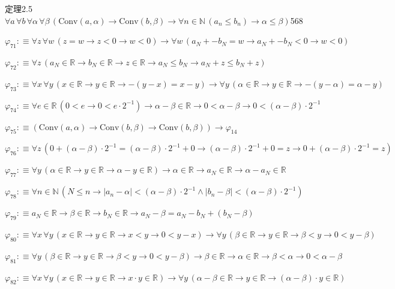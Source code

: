 \begin{fullproof}{定理2.5}{$\forall a\,\forall b\,\forall \alpha\,\forall \beta\,(\mathrm{Conv}(a,\alpha) \to \mathrm{Conv}(b,\beta) \to \forall n \in \mathbb{N}\,(a_{n} \leq b_{n}) \to \alpha \leq \beta)$}{568}
\begin{abbrevlist}
\item $\varphi_{71} :\equiv \forall z\,\forall w\,(z = w \to z < 0 \to w < 0) \to \forall w\,(a_{N} + -b_{N} = w \to a_{N} + -b_{N} < 0 \to w < 0)$
\item $\varphi_{72} :\equiv \forall z\,(a_{N} \in \mathbb{R} \to b_{N} \in \mathbb{R} \to z \in \mathbb{R} \to a_{N} \leq b_{N} \to a_{N} + z \leq b_{N} + z)$
\item $\varphi_{73} :\equiv \forall x\,\forall y\,(x \in \mathbb{R} \to y \in \mathbb{R} \to -(y - x) = x - y) \to \forall y\,(\alpha \in \mathbb{R} \to y \in \mathbb{R} \to -(y - \alpha) = \alpha - y)$
\item $\varphi_{74} :\equiv \forall e \in \mathbb{R}\,(0 < e \to 0 < e \cdot 2^{-1}) \to \alpha - \beta \in \mathbb{R} \to 0 < \alpha - \beta \to 0 < (\alpha - \beta) \cdot 2^{-1}$
\item $\varphi_{75} :\equiv (\mathrm{Conv}(a,\alpha) \to \mathrm{Conv}(b,\beta) \to \mathrm{Conv}(b,\beta)) \to \varphi_{14}$
\item $\varphi_{76} :\equiv \forall z\,(0 + (\alpha - \beta) \cdot 2^{-1} = (\alpha - \beta) \cdot 2^{-1} + 0 \to (\alpha - \beta) \cdot 2^{-1} + 0 = z \to 0 + (\alpha - \beta) \cdot 2^{-1} = z)$
\item $\varphi_{77} :\equiv \forall y\,(\alpha \in \mathbb{R} \to y \in \mathbb{R} \to \alpha - y \in \mathbb{R}) \to \alpha \in \mathbb{R} \to a_{N} \in \mathbb{R} \to \alpha - a_{N} \in \mathbb{R}$
\item $\varphi_{78} :\equiv \forall n \in \mathbb{N}\,(N \leq n \to \lvert a_{n} - \alpha \rvert < (\alpha - \beta) \cdot 2^{-1} \land \lvert b_{n} - \beta \rvert < (\alpha - \beta) \cdot 2^{-1})$
\item $\varphi_{79} :\equiv a_{N} \in \mathbb{R} \to \beta \in \mathbb{R} \to b_{N} \in \mathbb{R} \to a_{N} - \beta = a_{N} - b_{N} + (b_{N} - \beta)$
\item $\varphi_{80} :\equiv \forall x\,\forall y\,(x \in \mathbb{R} \to y \in \mathbb{R} \to x < y \to 0 < y - x) \to \forall y\,(\beta \in \mathbb{R} \to y \in \mathbb{R} \to \beta < y \to 0 < y - \beta)$
\item $\varphi_{81} :\equiv \forall y\,(\beta \in \mathbb{R} \to y \in \mathbb{R} \to \beta < y \to 0 < y - \beta) \to \beta \in \mathbb{R} \to \alpha \in \mathbb{R} \to \beta < \alpha \to 0 < \alpha - \beta$
\item $\varphi_{82} :\equiv \forall x\,\forall y\,(x \in \mathbb{R} \to y \in \mathbb{R} \to x \cdot y \in \mathbb{R}) \to \forall y\,(\alpha - \beta \in \mathbb{R} \to y \in \mathbb{R} \to (\alpha - \beta) \cdot y \in \mathbb{R})$

\end{abbrevlist}
\end{fullproof}
